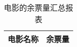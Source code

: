 \documentclass[UTF8]{ctexart}
\newcommand{\kaiti}{\CJKfamily{kaiti}}
\begin{document}
\begin{center}
    \begin{table}
        \renewcommand\arraystretch{2}
        \LARGE
        \setlength{\tabcolsep}{20mm}
        {
            \begin{tabular}{|c|c|}
                \hline
                \kaiti 电影名称 & \kaiti 余票量 \\
                \hline
            \end{tabular}
        }
        \caption*{电影的余票量汇总报表}
    \end{table}
\end{center}
\end{document}
